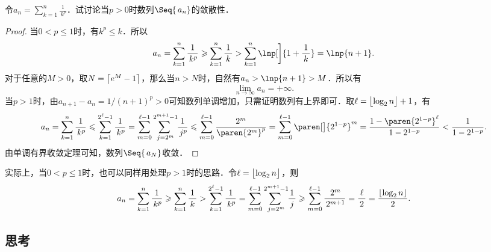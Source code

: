\begin{example*}
  令\(\displaystyle a_n = \sum_{k=1}^n \frac1{\,k^p}\)．试讨论当\(p > 0\)时数列\(\Seq{\,a_n}\)的敛散性．

  \begin{proof}
    当\(0 < p \le 1\)时，有\(k^p \le k\)．所以
    \begin{equation*}
      a_n = \sum_{k=1}^n \frac1{\,k^p} \ge \sum_{k=1}^n \frac1{\,k\,}
      > \sum_{k=1}^n \lnp[\bigg]{1+\frac1{\,k\,}} = \lnp{n+1}.
    \end{equation*}
    对于任意的\(M > 0\)，取\(N = \ceil[\big]{e^M - 1}\)，那么当\(n > N\)时，自然有\(a_n > \lnp{n+1} > M\)．所以有
    \begin{equation*}
      \lim_{n\to\infty} a_n = +\infty.
    \end{equation*}
    当\(p > 1\)时，由\(a_{n+1} - a_n = 1/(n+1)^p > 0\)可知数列单调增加，只需证明数列有上界即可．取\(\ell = \floor[\big]{\log_2 n} + 1\)，有
    \begin{equation*}
      a_n
      = \sum_{k=1}^n \frac1{\,k^p}
      \le \sum_{k=1}^{2^\ell-1} \frac1{\,k^p}
      = \sum_{m=0}^{\ell-1} \sum_{\,j=2^m\!}^{2^{m+1}-1\!\!} \frac{1}{\,j^p}
      \le \sum_{m=0}^{\ell-1} \frac{2^m}{\paren{2^m}^p}
      = \sum_{m=0}^{\ell-1} \paren[\big]{2^{1-p}}^m
      = \frac{1-\paren{2^{1-p}}^\ell}{1-2^{1-p}}
      < \frac{1}{1-2^{1-p}}.
    \end{equation*}
    由单调有界收敛定理可知，数列\(\Seq{\,a_N}\)收敛．
  \end{proof}
  \begin{remark}
    实际上，当\(0 < p \le 1\)时，也可以同样用处理\(p > 1\)时的思路．令\(\ell = \floor[\big]{\log_2 n}\)，则
    \begin{equation*}
      a_n
      = \sum_{k=1}^n \frac1{\,k^p}
      \ge \sum_{k=1}^n \frac1{\,k\,}
      > \sum_{k=1}^{2^\ell-1} \frac1{\,k^p}
      = \sum_{m=0}^{\ell-1} \sum_{\,j=2^m\!}^{2^{m+1}-1\!\!} \frac{1}{\,j\,}
      \ge \sum_{m=0}^{\ell-1} \frac{\,2^m}{\,2^{m+1}}
      = \frac{\ell}{\,2\,}
      = \frac{\floor{\log_2 n}}{2}.
    \end{equation*}
  \end{remark}
\end{example*}

\subsection*{思考}

